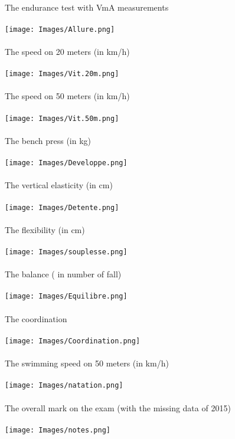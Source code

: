 \documentclass[
	12pt, %
]{fphw_assignment_toc}
\begin{document}
\\
The endurance test with VmA measurements 
\\
\bigskip
\\
\texttt{[image: Images/Allure.png]}
\\
\bigskip
\\
The speed on 20 meters (in km/h)
\\
\bigskip
\\
\texttt{[image: Images/Vit.20m.png]}
\\
\bigskip
\\
\newpage
The speed on 50 meters (in km/h)
\\
\bigskip
\\
\texttt{[image: Images/Vit.50m.png]}
\\
\bigskip
\\
The bench press (in kg)
\\
\bigskip
\\
\texttt{[image: Images/Developpe.png]}
\\
\bigskip
\\
The vertical elasticity (in cm)
\\
\bigskip
\\
\texttt{[image: Images/Detente.png]}
\\
\bigskip
\\
The flexibility (in cm)
\\
\bigskip
\\
\texttt{[image: Images/souplesse.png]}
\\
\bigskip
\\
The balance ( in number of fall)
\\
\bigskip
\\
\texttt{[image: Images/Equilibre.png]}
\\
\bigskip
\\
\newpage
The coordination 
\\
\bigskip
\\
\texttt{[image: Images/Coordination.png]}
\\
\bigskip
\\
The swimming speed  on 50 meters (in km/h)
\\
\bigskip
\\
\texttt{[image: Images/natation.png]}
\\
\bigskip
\\
The overall mark on the exam (with the missing data of 2015)
\\
\bigskip
\\
\texttt{[image: Images/notes.png]}
\\
\bigskip
\\
\end{document}
